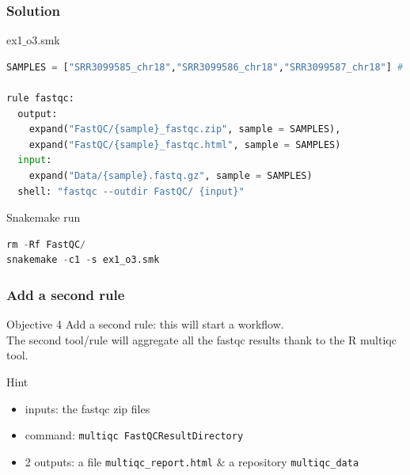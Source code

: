 \begin{frame}[containsverbatim]
\frametitle{Solution}
\begin{exampleblock}{ex1$\_$o3.smk}
\begin{lstlisting}[language=python]
SAMPLES = ["SRR3099585_chr18","SRR3099586_chr18","SRR3099587_chr18"] # add all 6 samples

rule fastqc:
  output:
    expand("FastQC/{sample}_fastqc.zip", sample = SAMPLES),
    expand("FastQC/{sample}_fastqc.html", sample = SAMPLES)
  input:
    expand("Data/{sample}.fastq.gz", sample = SAMPLES)
  shell: "fastqc --outdir FastQC/ {input}"
\end{lstlisting}
\end{exampleblock}
\begin{exampleblock}{Snakemake run}
\begin{lstlisting}[language=python]
rm -Rf FastQC/
snakemake -c1 -s ex1_o3.smk
\end{lstlisting}
\end{exampleblock}
\end{frame}
\begin{frame}[containsverbatim]
\frametitle{Add a second rule}
\begin{exampleblock}{Objective 4}
Add a second rule: this will start a workflow. \\
The second tool/rule will aggregate all the fastqc results thank to the R multiqc tool. 
\end{exampleblock}
\begin{exampleblock}{Hint}
\begin{itemize}
    \item inputs: the fastqc zip files
    \item command: \verb|multiqc FastQCResultDirectory|
    \item 2 outputs: a file \verb|multiqc_report.html| \& a repository \verb|multiqc_data|
\end{itemize}
\end{exampleblock}
\end{frame}
